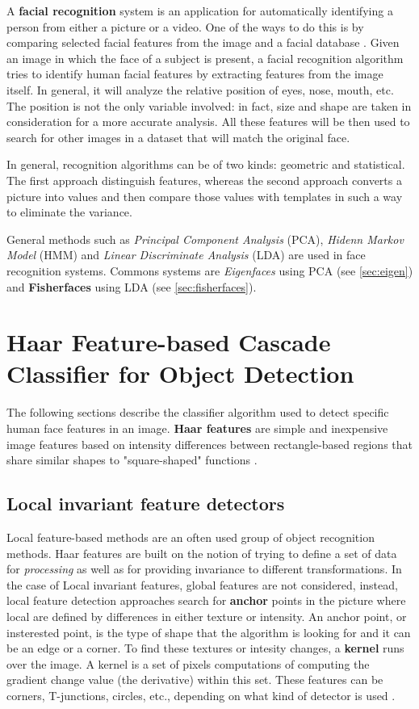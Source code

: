 \documentclass{report}
\begin{document}
A \textbf{facial recognition} system is an application for automatically identifying a person from either a picture or a video. One of the ways to do this is by comparing selected facial features from the image and a facial database \cite{face-recognition-wiki}.
Given an image in which the face of a subject is present, a facial recognition algorithm tries to identify human facial features by extracting features from the image itself.
In general, it will analyze the relative position of eyes, nose, mouth, etc. The position is not the only variable involved: in fact, size and shape are taken in consideration for a more accurate analysis. All these features will be then used to search for other images in a dataset that will match the original face.

In general, recognition algorithms can be of two kinds: geometric and statistical. The first approach distinguish features, whereas the second approach converts a picture into values and then compare those values with templates in such a way to eliminate the variance.

General methods such as \textit{Principal Component Analysis} (PCA), \textit{Hidenn Markov Model} (HMM) and \textit{Linear Discriminate Analysis} (LDA) are used in face recognition systems. Commons systems are \textit{Eigenfaces} using PCA (see \ref{sec:eigen}) and \textbf{Fisherfaces} using LDA (see \ref{sec:fisherfaces}).

\section{Haar Feature-based Cascade Classifier for Object Detection}
\label{sec:haar}
The following sections describe the classifier algorithm used to detect specific human face features in an image. \textbf{Haar features} are simple and inexpensive image features based on intensity differences between rectangle-based regions that share similar shapes to "square-shaped" functions \cite{oren1997pedestrian}\cite{papageorgiou2000trainable}\cite{features}.

\subsection{Local invariant feature detectors}
Local feature-based methods are an often used group of object recognition methods\cite{tuytelaars2008local}. Haar features are built on the notion of trying to define a set of data for \textit{processing} as well as for providing invariance to different transformations. In the case of Local invariant features, global features are not considered, instead, local feature detection approaches search for \textbf{anchor} points in the picture where local are defined by differences in either texture or intensity. An anchor point, or insterested point, is the type of shape that the algorithm is looking for and it can be an edge or a corner.
To find these textures or intesity changes, a \textbf{kernel} runs over the image. A kernel is a set of pixels computations of computing the gradient change value (the derivative) within this set. These features can be corners, T-junctions, circles, etc., depending on what kind of detector is used \cite{reinius2013object}\cite{tuytelaars2008local}.
\end{document}
